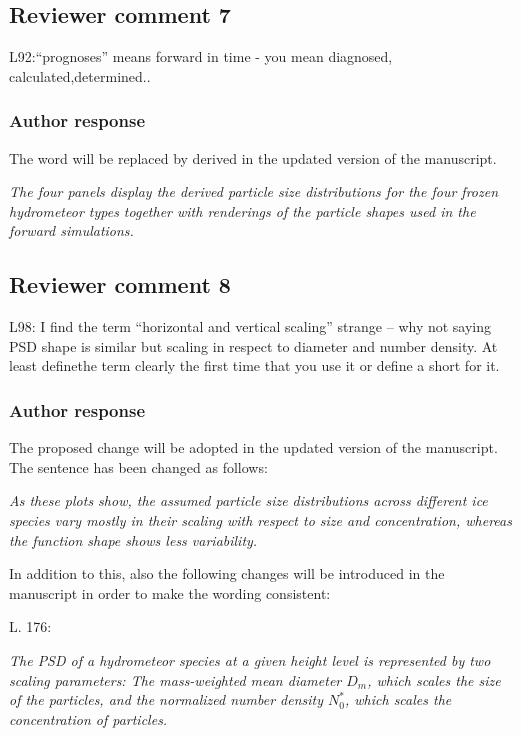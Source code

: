 \documentclass[11pt]{scrartcl}
\begin{document}
\subsection*{Reviewer comment 7}

L92:“prognoses”   means   forward   in   time   -   you   mean   diagnosed,   calculated,determined..

\subsubsection*{Author response}

The  word will be replaced by derived in the updated version of the manuscript.

{\itshape The four panels display the derived particle size distributions for the
  four frozen hydrometeor types together with renderings of the particle shapes
  used in the forward simulations.}


\subsection*{Reviewer comment 8}
L98: I find the term “horizontal and vertical scaling” strange – why not saying PSD shape is similar but scaling in respect to diameter and number density. At least definethe term clearly the first time that you use it or define a short for it.

\subsubsection*{Author response}
 
The proposed  change will be adopted in the updated version of the manuscript. The sentence has been changed
as follows:

{\itshape
As these plots show, the
assumed particle size distributions across different ice species vary mostly in
their scaling with respect to size and concentration, whereas the function shape shows less
variability.}

In addition to this, also the following changes will be introduced in the manuscript in order
to make the wording consistent:


L. 176:

{\itshape The PSD of a hydrometeor species at a given height level is represented
  by two scaling parameters: The mass-weighted mean diameter $D_m$, which scales
  the size of the particles, and the normalized number density $N_0^*$, which
  scales the concentration of particles.}
\end{document}
